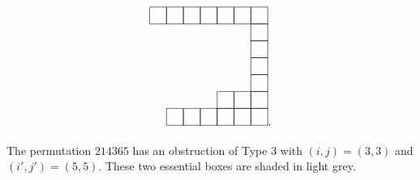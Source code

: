 \documentclass[ALCO,Unicode,published]{cedram}
\begin{document}
\begin{example}
\[\begin{tikzpicture}[x=1.5em,y=1.5em]
      \draw[color=black](4,2)rectangle(5,3);
      \draw[color=black](5,2)rectangle(6,3); 
      \draw[color=black](1,1)rectangle(2,2);  
      \draw[color=black](2,1)rectangle(3,2);
      \draw[color=black](3,1)rectangle(4,2); 
      \draw[color=black](4,1)rectangle(5,2);
      \draw[color=black](5,1)rectangle(6,2); 
      \draw[color=black](0,7)rectangle(1,8); 
      \draw[color=black](1,7)rectangle(2,8); 
      \draw[color=black](2,7)rectangle(3,8);
      \draw[color=black](3,7)rectangle(4,8);
      \draw[color=black](4,7)rectangle(5,8);
      \draw[color=black](5,7)rectangle(6,8); 
      \draw[color=black](6,7)rectangle(7,8); 
      \draw[color=black](6,1)rectangle(7,2); 
       \draw[color=black](6,2)rectangle(7,3); 
       \draw[color=black](6,3)rectangle(7,4); 
       \draw[color=black](6,4)rectangle(7,5); 
       \draw[color=black](6,5)rectangle(7,6); 
       \draw[color=black](6,6)rectangle(7,7); 
     \end{tikzpicture}.
\]

The permutation $214365$ has an obstruction of Type $3$ with $(i,j) = (3,3)$ and $(i',j') = (5,5)$.  These two essential boxes are shaded in light grey. 


\end{example}
\end{document}
